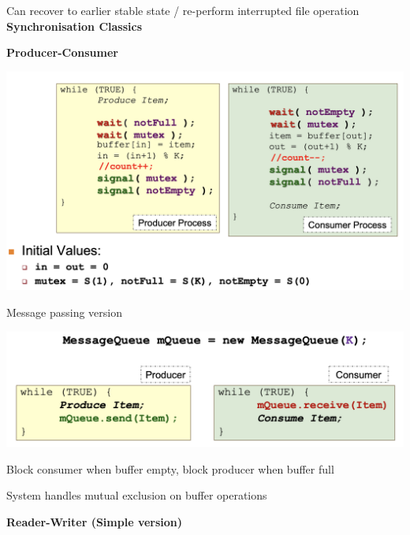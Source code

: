 \documentclass[10pt, a4paper]{article}
\newcommand{\header}[1]{{\normalsize\textbf{#1}}}
\begin{document}
\begin{multicols*}{3}
		Can recover to earlier stable state / re-perform interrupted file operation\\

		\header{Synchronisation Classics}

		\textbf{Producer-Consumer}

		\includegraphics[scale=0.2]{./assets/ProducerConsumer.png}

		Message passing version

		\includegraphics[scale=.34]{./assets/producerConsumerMessage.png}

		Block consumer when buffer empty, block producer when buffer full

		System handles mutual exclusion on buffer operations
		
		\textbf{Reader-Writer (Simple version)}


\end{multicols*}
\end{document}
